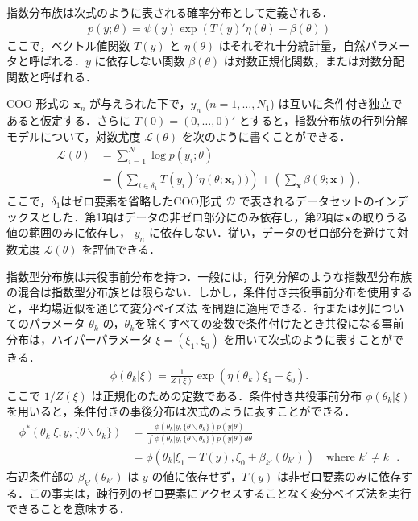 \documentclass[paper=a4,10.5pt]{jsarticle} %
\numberwithin{equation}{section} %
\begin{document}
指数分布族は次式のように表される確率分布として定義される．
\begin{align}
p(y;\theta) =  \psi(y) \exp(T(y)' \eta(\theta) - \beta (\theta) )
\end{align}
ここで，ベクトル値関数 $T(y)$ と $\eta(\theta)$ はそれぞれ十分統計量，自然パラメータと呼ばれる．$y$ に依存しない関数 $\beta(\theta)$ は対数正規化関数，または対数分配関数と呼ばれる．

COO 形式の $\boldsymbol{x}_n$ が与えられた下で，$y_n$ ($n=1, \ldots, N_1$) は互いに条件付き独立であると仮定する．さらに $T(0) = (0, \ldots, 0)'$ とすると，指数分布族の行列分解モデルについて，対数尤度 $\mathcal{L}(\theta)$ を次のように書くことができる．
\begin{align}
\mathcal{L}(\theta) &= \sum_{i=1}^N \log p(y_i; \theta) \nonumber\\
&= \left(\sum_{i \in \delta_1} T(y_i)' \eta(\theta; \boldsymbol{x}_i))\right) +  \left(\sum_{\boldsymbol{x}} \beta(\theta; \boldsymbol{x}) \right), \label{ll0}
\end{align}
ここで，$\delta_1$はゼロ要素を省略したCOO形式 $\mathcal{D}$ で表されるデータセットのインデックスとした．第1項はデータの非ゼロ部分にのみ依存し，第2項は$\boldsymbol{x}$の取りうる値の範囲のみに依存し， $y_n$ に依存しない．従い，データのゼロ部分を避けて対数尤度 $\mathcal{L}(\theta)$ を評価できる．

指数型分布族は共役事前分布を持つ．一般には，行列分解のような指数型分布族の混合は指数型分布族とは限らない．しかし，条件付き共役事前分布を使用すると，平均場近似を通じて変分ベイズ法\citep{blei2017variational} を問題に適用できる．行または列についてのパラメータ $\theta_k$ の，$\theta_k$を除くすべての変数で条件付けたとき共役になる事前分布は，ハイパーパラメータ $\xi = (\xi_1, \xi_0)$ を用いて次式のように表すことができる．
\begin{align*}
\phi(\theta_k|\xi) = \frac{1}{Z(\xi)}\exp(\eta(\theta_k) \xi_1 +  \xi_0).
\end{align*}
ここで $1/Z(\xi)$ は正規化のための定数である．条件付き共役事前分布 $\phi(\theta_k|\xi)$ を用いると，条件付きの事後分布は次式のように表すことができる．
\begin{align*}
\phi^{\ast}(\theta_k|\xi,y, \{\theta \smallsetminus \theta_k\}) &= \frac{\phi(\theta_k |y, \{\theta \smallsetminus \theta_k\}) p(y|\theta)}{\int \phi(\theta_k |y, \{\theta \smallsetminus \theta_k\}) p(y|\theta) d \theta} \\
&= \phi(\theta_k|\xi_1+T(y), \xi_0 + \beta_{k'}(\theta_{k'}) ) \quad \mbox{where $k' \neq k$ }.
\end{align*}
右辺条件部の $\beta_{k'}(\theta_{k'})$ は $y$ の値に依存せず，$T(y)$ は非ゼロ要素のみに依存する．この事実は，疎行列のゼロ要素にアクセスすることなく変分ベイズ法を実行できることを意味する．
\end{document}
